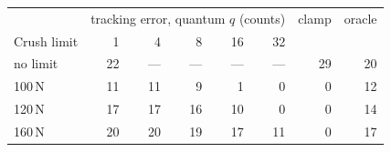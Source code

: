 \begin{tabular}{lrrrrrrr}
\toprule
 & \multicolumn{5}{c}{tracking error, quantum $q$ (counts)} & clamp & oracle \\
Crush limit & 1 & 4 & 8 & 16 & 32 & & \\
\midrule
no limit & 22 & --- & --- & --- & --- & 29 & 20 \\
100\,N & 11 & 11 & 9 & 1 & 0 & 0 & 12 \\
120\,N & 17 & 17 & 16 & 10 & 0 & 0 & 14 \\
160\,N & 20 & 20 & 19 & 17 & 11 & 0 & 17 \\
\bottomrule
\end{tabular}
